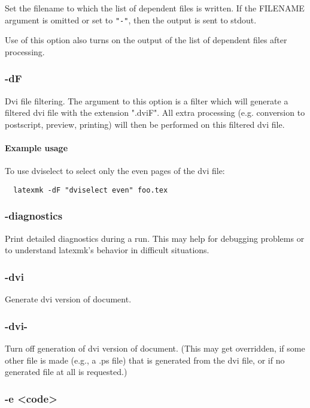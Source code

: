 Set the filename to which the list of dependent files  is  written.   If  the
FILENAME argument is omitted or set to \verb|"-"|, then the output is sent to
stdout.

Use of this option also turns on the output of the list  of  dependent files
after processing.

\subsubsection{-dF}

Dvi  file  filtering.   The  argument to this option is a filter which will
generate a  filtered  dvi  file  with  the  extension ".dviF".   All  extra
processing (e.g. conversion to postscript, preview, printing) will then be
performed on this  filtered  dvi file.

\paragraph{Example usage}

To use dviselect to select only the even pages of the dvi file:


\begin{verbatim}
  latexmk -dF "dviselect even" foo.tex
\end{verbatim}


\subsubsection{-diagnostics}

Print detailed diagnostics during a run.  This may help for  debugging problems
or to understand latexmk's behavior in difficult situations.

\subsubsection{-dvi}

Generate dvi version of document.

\subsubsection{-dvi-}

Turn off generation of dvi version of document.  (This  may  get
overridden,  if  some other file is made (e.g., a .ps file) that
is generated from the dvi file, or if no generated file  at  all
is requested.)


\subsubsection{-e <code>}

